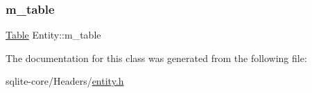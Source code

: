 \subsubsection{\texorpdfstring{m\+\_\+table}{m\_table}}
{\footnotesize\ttfamily \mbox{\hyperlink{classTable}{Table}} Entity\+::m\+\_\+table\hspace{0.3cm}{\ttfamily [private]}}



The documentation for this class was generated from the following file\+:\begin{DoxyCompactItemize}
\item 
sqlite-\/core/\+Headers/\mbox{\hyperlink{entity_8h}{entity.\+h}}\end{DoxyCompactItemize}
